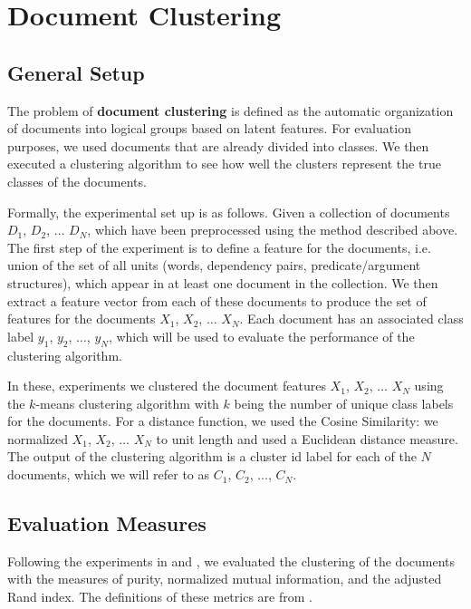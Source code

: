 \documentclass[11pt]{article}
\newcommand{\bt}[1]{\textbf{#1}}
\begin{document}
\section{Document Clustering} \label{sec:DocumentClusterting}

\subsection{General Setup}

The problem of \bt{document clustering} is defined as the automatic organization of documents into logical groups based on latent features. For evaluation purposes, we used documents that are already divided into classes. We then executed a clustering algorithm to see how well the clusters represent the true classes of the documents. 

Formally, the experimental set up is as follows. Given a collection of documents $D_1$, $D_2$, $\dots$ $D_N$,  which have been preprocessed using the method described above. The first step of the experiment is to define a feature for the documents, i.e. union of the set of all units (words, dependency pairs, predicate/argument structures), which appear in at least one document in the collection. We then extract a feature vector from each of these documents to produce the set of features for the documents $X_1$, $X_2$, $\dots$ $X_N$. Each document has an associated class label $y_1$, $y_2$, $\dots$, $y_N$, which will be used to evaluate the performance of the clustering algorithm.

In these, experiments we clustered the document features $X_1$, $X_2$, $\dots$ $X_N$ using the $k$-means clustering algorithm with $k$ being the number of unique class labels for the documents. For a distance function, we used the Cosine Similarity: we normalized $X_1$, $X_2$, $\dots$ $X_N$  to unit length and used a Euclidean distance measure. The output of the clustering algorithm is a cluster id label for each of the $N$ documents, which we will refer to as $C_1$, $C_2$, $\dots$, $C_N$. 


\subsection{Evaluation Measures}

Following the experiments in \cite{Huang2008} and \cite{Hofmann2000}, we evaluated the clustering of the documents with the measures of purity, normalized mutual information, and the adjusted Rand index. The definitions of these metrics are from \cite{Manning2008}.
\end{document}
